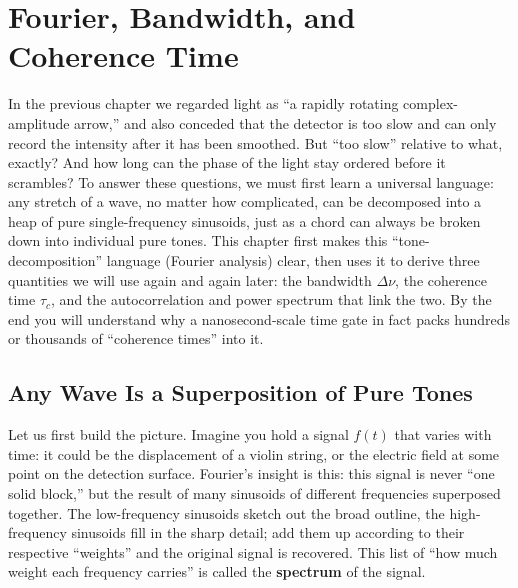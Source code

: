 \chapter{Fourier, Bandwidth, and Coherence Time}
\label{chap:e02}

\begin{chapteropening}
In the previous chapter we regarded light as ``a rapidly rotating complex-amplitude arrow,'' and also conceded that the detector is too slow and can only record the intensity after it has been smoothed. But ``too slow'' relative to what, exactly? And how long can the phase of the light stay ordered before it scrambles? To answer these questions, we must first learn a universal language: any stretch of a wave, no matter how complicated, can be decomposed into a heap of pure single-frequency sinusoids, just as a chord can always be broken down into individual pure tones. This chapter first makes this ``tone-decomposition'' language (Fourier analysis) clear, then uses it to derive three quantities we will use again and again later: the bandwidth \(\Delta\nu\), the coherence time \(\tau_c\), and the autocorrelation and power spectrum that link the two. By the end you will understand why a nanosecond-scale time gate in fact packs hundreds or thousands of ``coherence times'' into it.
\end{chapteropening}

\section{Any Wave Is a Superposition of Pure Tones}
\label{sec:e02-fourier-idea}

Let us first build the picture. Imagine you hold a signal \(f(t)\) that varies with time: it could be the displacement of a violin string, or the electric field at some point on the detection surface. Fourier's insight is this: this signal is never ``one solid block,'' but the result of many sinusoids of different frequencies superposed together. The low-frequency sinusoids sketch out the broad outline, the high-frequency sinusoids fill in the sharp detail; add them up according to their respective ``weights'' and the original signal is recovered. This list of ``how much weight each frequency carries'' is called the \textbf{spectrum} of the signal.

